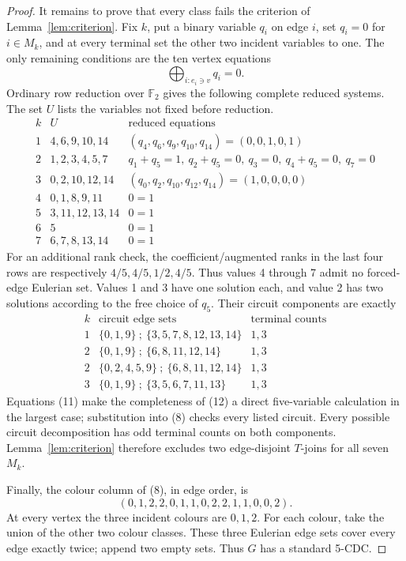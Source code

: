 \documentclass[11pt]{article}
\theoremstyle{definition}
\theoremstyle{remark}
\newcommand{\F}{\mathbb F}
\begin{document}
\begin{proof}
It remains to prove that every class fails the criterion of
Lemma~\ref{lem:criterion}.  Fix \(k\), put a binary variable \(q_i\) on
edge \(i\), set \(q_i=0\) for \(i\in M_k\), and at every terminal set the
other two incident variables to one.  The only remaining conditions are
the ten vertex equations
\[
 \bigoplus_{i:e_i\ni v}q_i=0.                    \tag{11}
\]
Ordinary row reduction over \(\F_2\) gives the following complete reduced
systems.  The set \(U\) lists the variables not fixed before reduction.
\[
\begin{array}{c|l|l}
k&U&\text{reduced equations}\\ \hline
1&4,6,9,10,14&(q_4,q_6,q_9,q_{10},q_{14})=(0,0,1,0,1)\\
2&1,2,3,4,5,7&q_1+q_5=1,\ q_2+q_5=0,\ q_3=0,\
                  q_4+q_5=0,\ q_7=0\\
3&0,2,10,12,14&(q_0,q_2,q_{10},q_{12},q_{14})=(1,0,0,0,0)\\
4&0,1,8,9,11&0=1\\
5&3,11,12,13,14&0=1\\
6&5&0=1\\
7&6,7,8,13,14&0=1
\end{array}                                                       \tag{12}
\]
For an additional rank check, the coefficient/augmented ranks in the
last four rows are respectively \(4/5,4/5,1/2,4/5\).  Thus values
4 through 7 admit no forced-edge Eulerian set.  Values 1 and 3 have one
solution each, and value 2 has two solutions according to the free choice
of \(q_5\).  Their circuit components are exactly
\[
\begin{array}{c|l|c}
k&\text{circuit edge sets}&\text{terminal counts}\\ \hline
1&\{0,1,9\}\ ;\ \{3,5,7,8,12,13,14\}&1,3\\
2&\{0,1,9\}\ ;\ \{6,8,11,12,14\}&1,3\\
2&\{0,2,4,5,9\}\ ;\ \{6,8,11,12,14\}&1,3\\
3&\{0,1,9\}\ ;\ \{3,5,6,7,11,13\}&1,3
\end{array}                                                       \tag{13}
\]
Equations (11) make the completeness of (12) a direct five-variable
calculation in the largest case; substitution into (8) checks every
listed circuit.  Every possible circuit decomposition has odd terminal
counts on both components.  Lemma~\ref{lem:criterion} therefore excludes
two edge-disjoint \(T\)-joins for all seven \(M_k\).

Finally, the colour column of (8), in edge order, is
\[
 (0,1,2,2,0,1,1,0,2,2,1,1,0,0,2).               \tag{14}
\]
At every vertex the three incident colours are \(0,1,2\).  For each
colour, take the union of the other two colour classes.  These three
Eulerian edge sets cover every edge exactly twice; append two empty sets.
Thus \(G\) has a standard 5-CDC.
\end{proof}
\end{document}
